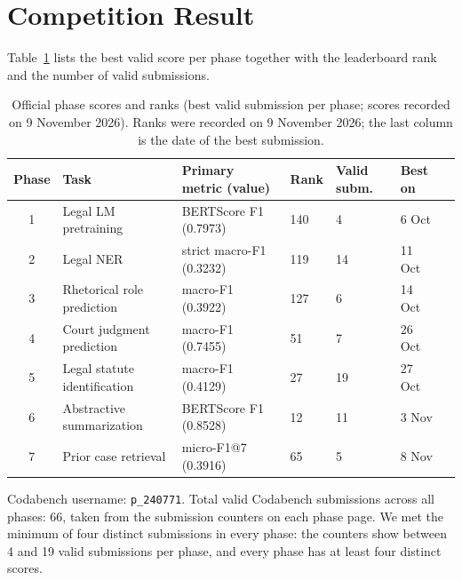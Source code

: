 \documentclass[10pt,a4paper]{article}
\begin{document}
\section{Competition Result}
Table~\ref{tab:official} lists the best valid score per phase together with the leaderboard rank and the number of valid submissions.
\begin{table}[h]\centering\small
\caption{Official phase scores and ranks (best valid submission per phase; scores recorded on 9 November 2026). Ranks were recorded on 9 November 2026; the last column is the date of the best submission.}\label{tab:official}
\begin{tabular}{@{}cllllll@{}}
\toprule
Phase & Task & Primary metric (value) & Rank & Valid subm. & Best on\\\midrule
1 & Legal LM pretraining & BERTScore F1 (0.7973) & 140 & 4 & 6 Oct\\
2 & Legal NER & strict macro-F1 (0.3232) & 119 & 14 & 11 Oct\\
3 & Rhetorical role prediction & macro-F1 (0.3922) & 127 & 6 & 14 Oct\\
4 & Court judgment prediction & macro-F1 (0.7455) & 51 & 7 & 26 Oct\\
5 & Legal statute identification & macro-F1 (0.4129) & 27 & 19 & 27 Oct\\
6 & Abstractive summarization & BERTScore F1 (0.8528) & 12 & 11 & 3 Nov\\
7 & Prior case retrieval & micro-F1@7 (0.3916) & 65 & 5 & 8 Nov\\\bottomrule
\end{tabular}
\end{table}
Codabench username: \texttt{p\_240771}. Total valid Codabench submissions across all phases: 66, taken from the submission counters on each phase page. We met the minimum of four distinct submissions in every phase: the counters show between 4 and 19 valid submissions per phase, and every phase has at least four distinct scores.
\end{document}
